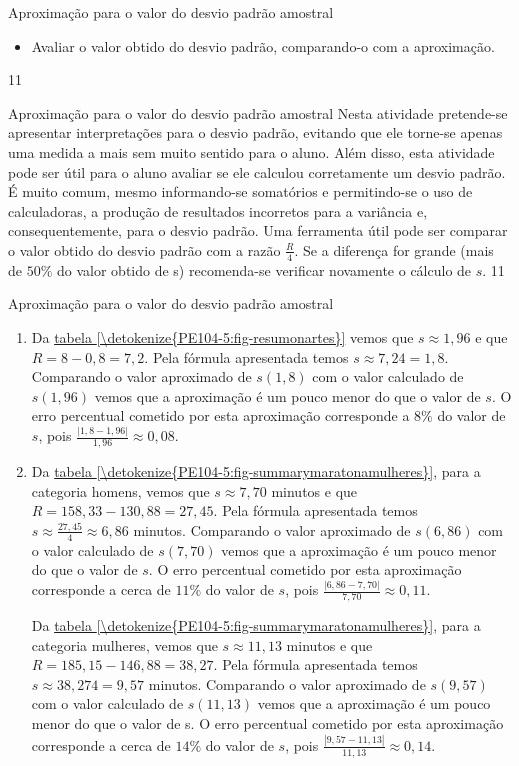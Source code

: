 {{{\begin{objectives}{Aproximação para o valor do desvio padrão amostral}
{\begin{itemize}
\item Avaliar o valor obtido do desvio padrão, comparando-o com a aproximação.
\end{itemize}
}{1}{1}
\end{objectives}
\begin{sugestions}{Aproximação para o valor do desvio padrão amostral}
{
Nesta atividade pretende-se apresentar interpretações para o desvio padrão, evitando que ele torne-se apenas uma medida a mais sem muito sentido para o aluno. Além disso, esta atividade pode ser útil para o aluno avaliar se ele calculou corretamente um desvio padrão. É muito comum, mesmo informando-se somatórios e permitindo-se o uso de calculadoras, a produção de resultados incorretos para a variância e, consequentemente, para o desvio padrão. Uma ferramenta útil pode ser comparar o valor obtido do desvio padrão com a razão $\frac{R}{4}$. Se a diferença for grande (mais de $50\%$ do valor obtido de s) recomenda-se verificar novamente o cálculo de $s$.
}{1}{1}
\end{sugestions}
\begin{answer}{Aproximação para o valor do desvio padrão amostral}
{
\begin{enumerate}
\item Da \hyperref[\detokenize{PE104-5:fig-resumonartes}]{tabela \ref{\detokenize{PE104-5:fig-resumonartes}}} vemos que $s\approx1{,}96$ e que $R=8-0{,}8=7{,}2$. Pela fórmula apresentada temos $s\approx7{,}24=1{,}8$. Comparando o valor aproximado de $s (1{,}8)$ com o valor calculado de $s (1{,}96)$ vemos que a aproximação é um pouco menor do que o valor de $s$. O erro percentual cometido por esta aproximação corresponde a $8\%$ do valor de $s$, pois $\frac{|1{,}8-1{,}96|}{1{,}96}\approx0{,}08$.
\item Da \hyperref[\detokenize{PE104-5:fig-summarymaratonamulheres}]{tabela \ref{\detokenize{PE104-5:fig-summarymaratonamulheres}}}, para a categoria homens, vemos que $s\approx7,70$ minutos e que $R=158{,}33-130{,}88=27{,}45$. Pela fórmula apresentada temos $s\approx\frac{27{,}45}{4}\approx6{,}86$ minutos. Comparando o valor aproximado de $s (6{,}86)$ com o valor calculado de $s (7{,}70)$ vemos que a aproximação é um pouco menor do que o valor de $s$. O erro percentual cometido por esta aproximação corresponde a cerca de $11\%$ do valor de $s$, pois $\frac{|6{,}86-7{,}70|}{7,70}\approx0{,}11$.

Da \hyperref[\detokenize{PE104-5:fig-summarymaratonamulheres}]{tabela \ref{\detokenize{PE104-5:fig-summarymaratonamulheres}}}, para a categoria mulheres, vemos que $s\approx11{,}13$ minutos e que $R=185{,}15-146{,}88=38{,}27$. Pela fórmula apresentada temos $s\approx38{,}274=9{,}57$ minutos. Comparando o valor aproximado de $s(9{,}57)$ com o valor calculado de $s(11{,}13)$ vemos que a aproximação é um pouco menor do que o valor de s. O erro percentual cometido por esta aproximação corresponde a cerca de $14\%$ do valor de $s$, pois $\frac{|9{,}57-11{,}13|}{11{,}13}\approx0,14$.


\end{enumerate}}
\end{answer}}}}
